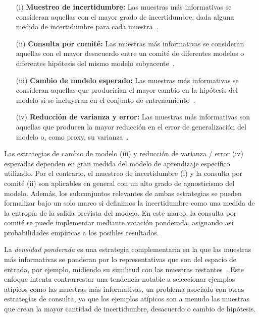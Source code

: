 \begin{itemize}
  \item [(i)] \textbf{Muestreo de incertidumbre:} Las muestras más informativas se consideran aquellas con el mayor grado de incertidumbre, dada alguna medida de incertidumbre para cada muestra~\cite{Lewis1994148}.

  \item [(ii)] \textbf{Consulta por comité:} Las muestras más informativas se consideran aquellas con el mayor desacuerdo entre un comité de diferentes modelos o diferentes hipótesis del mismo modelo subyacente~\cite{seungquery}.

  \item [(iii)] \textbf{Cambio de modelo esperado:} Las muestras más informativas se consideran aquellas que producirían el mayor cambio en la hipótesis del modelo si se incluyeran en el conjunto de entrenamiento~\cite{NIPS2007_3252}.

  \item [(iv)] \textbf{Reducción de varianza y error:} Las muestras más informativas son aquellas que producen la mayor reducción en el error de generalización del modelo o, como proxy, su varianza~\cite{roy2001toward}.
\end{itemize}

Las estrategias de cambio de modelo (iii) y reducción de varianza / error (iv) esperadas dependen en gran medida del modelo de aprendizaje específico utilizado.
Por el contrario, el muestreo de incertidumbre (i) y la consulta por comité (ii) son aplicables en general con un alto grado de agnosticismo del modelo.
Además, los subconjuntos relevantes de ambas estrategias se pueden formalizar bajo un solo marco si definimos la incertidumbre como una medida de la entropía de la salida prevista del modelo.
En este marco, la consulta por comité se puede implementar mediante votación ponderada, asignando así probabilidades empíricas a los posibles resultados.

La \textit{densidad ponderada} es una estrategia complementaria en la que las muestras más informativas se ponderan por lo representativas que son del espacio de entrada, por ejemplo, midiendo su similitud con las muestras restantes~\cite{settles2008analysis}.
Este enfoque intenta contrarrestar una tendencia notable a seleccionar ejemplos atípicos como las muestras más informativas, un problema asociado con otras estrategias de consulta, ya que los ejemplos atípicos son a menudo las muestras que crean la mayor cantidad de incertidumbre, desacuerdo o cambio de hipótesis.

